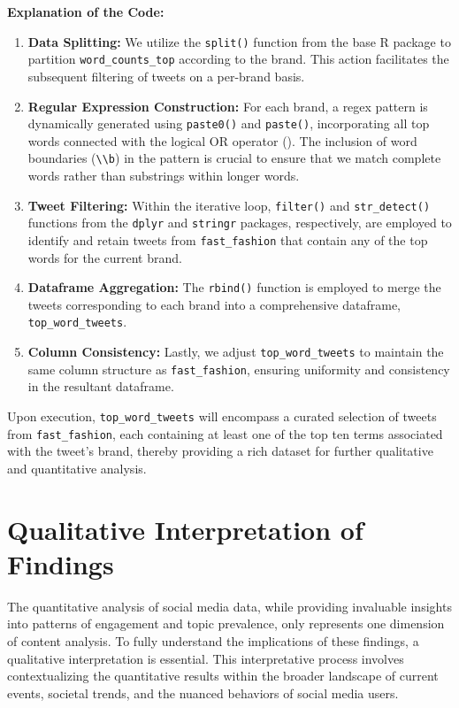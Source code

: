 \documentclass[
]{book}
\begin{document}
\textbf{Explanation of the Code:}

\begin{enumerate}
\def\labelenumi{\arabic{enumi}.}
\item
  \textbf{Data Splitting:} We utilize the \texttt{split()} function from the base R package to partition \texttt{word\_counts\_top} according to the brand. This action facilitates the subsequent filtering of tweets on a per-brand basis.
\item
  \textbf{Regular Expression Construction:} For each brand, a regex pattern is dynamically generated using \texttt{paste0()} and \texttt{paste()}, incorporating all top words connected with the logical OR operator (\texttt{\textbar{}}). The inclusion of word boundaries (\texttt{\textbackslash{}\textbackslash{}b}) in the pattern is crucial to ensure that we match complete words rather than substrings within longer words.
\item
  \textbf{Tweet Filtering:} Within the iterative loop, \texttt{filter()} and \texttt{str\_detect()} functions from the \texttt{dplyr} and \texttt{stringr} packages, respectively, are employed to identify and retain tweets from \texttt{fast\_fashion} that contain any of the top words for the current brand.
\item
  \textbf{Dataframe Aggregation:} The \texttt{rbind()} function is employed to merge the tweets corresponding to each brand into a comprehensive dataframe, \texttt{top\_word\_tweets}.
\item
  \textbf{Column Consistency:} Lastly, we adjust \texttt{top\_word\_tweets} to maintain the same column structure as \texttt{fast\_fashion}, ensuring uniformity and consistency in the resultant dataframe.
\end{enumerate}

Upon execution, \texttt{top\_word\_tweets} will encompass a curated selection of tweets from \texttt{fast\_fashion}, each containing at least one of the top ten terms associated with the tweet's brand, thereby providing a rich dataset for further qualitative and quantitative analysis.

\hypertarget{qualitative-interpretation-of-findings}{%
\section{Qualitative Interpretation of Findings}\label{qualitative-interpretation-of-findings}}

The quantitative analysis of social media data, while providing invaluable insights into patterns of engagement and topic prevalence, only represents one dimension of content analysis. To fully understand the implications of these findings, a qualitative interpretation is essential. This interpretative process involves contextualizing the quantitative results within the broader landscape of current events, societal trends, and the nuanced behaviors of social media users.
\end{document}
